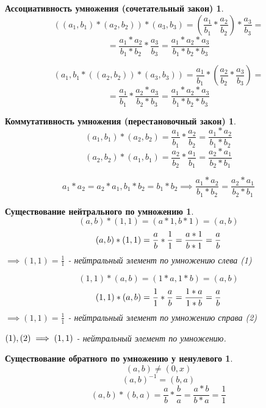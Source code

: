 \documentclass[14pt,a4paper,oneside,russian]{article}
\newtheorem*{axiom6}{Ассоциативность умножения (сочетательный закон)}
\newtheorem*{axiom7}{Коммутативность умножения (перестановочный закон)}
\newtheorem*{axiom8}{Существование нейтрального по умножению}
\newtheorem*{axiom9}{Существование обратного по умножению у ненулевого}
\begin{document}
\begin{axiom6}
$$ ((a_1, b_1) * (a_2, b_2)) * (a_3, b_3) = (\frac{a_1}{b_1} * \frac{a_2}{b_2}) * \frac{a_3}{b_3} = $$
$$ = \frac{a_1 * a_2}{b_1 * b_2} * \frac{a_3}{b_3} = \frac{a_1 * a_2 * a_3}{b_1 * b_2 * b_3} $$

$$ (a_1, b_1 * ((a_2, b_2)) * (a_3, b_3)) = \frac{a_1}{b_1} * (\frac{a_2}{b_2} * \frac{a_3}{b_3}) = $$
$$ = \frac{a_1}{b_1} * \frac{a_2 * a_3}{b_2 * b_3} = \frac{a_1 * a_2 * a_3}{b_1 * b_2 * b_3} $$
\end{axiom6}
\newpage

\begin{axiom7}
$$ (a_1, b_1) * (a_2, b_2) = \frac{a_1}{b_1} * \frac{a_2}{b_2} = \frac{a_1 * a_2}{b_1 * b_2} $$
$$ (a_2, b_2) * (a_1, b_1) = \frac{a_2}{b_2} * \frac{a_1}{b_1} = \frac{a_2 * a_1}{b_2 * b_1} $$

$$ a_1 * a_2 = a_2 * a_1, b_1 * b_2 = b_1 * b_2 \implies \frac{a_1 * a_2}{b_1 * b_2} = \frac{a_2 * a_1}{b_2 * b_1} $$
\end{axiom7}
\newpage

\begin{axiom8}
$$ (a, b) * (1, 1) = (a * 1, b * 1) = (a, b) $$
$$
(a, b) * (1, 1) = \frac{a}{b} * \frac{1}{1} = \frac{a * 1}{b * 1} = \frac{a}{b}
\newline
$$
$ \implies (1, 1) = \frac{1}{1} $ - нейтральный элемент по умножению слева (1)

$$ (1, 1) * (a, b) = (1 * a, 1 * b) = (a, b) $$
$$
(1, 1) * (a, b) = \frac{1}{1} * \frac{a}{b} = \frac{1 * a}{1 * b} = \frac{a}{b}
\newline
$$
$ \implies (1, 1) = \frac{1}{1} $ - нейтральный элемент по умножению справа (2)

$ \newline (1), (2) \implies (1, 1) $ - нейтральный элемент по умножению.
\end{axiom8}
\newpage

\begin{axiom9}
$$ (a, b) \neq (0, x) $$
$$ (a, b)^{-1} = (b, a) $$
$$ (a, b) * (b, a) = \frac{a}{b} * \frac{b}{a} = \frac{a * b}{b * a} = \frac{1}{1} $$
\end{axiom9}
\end{document}
